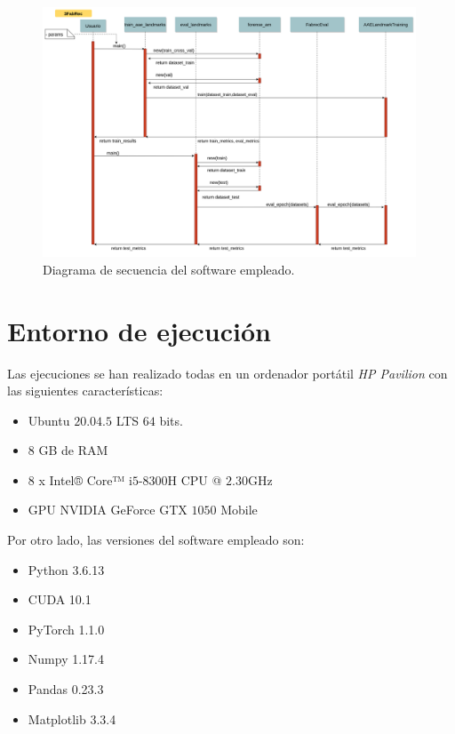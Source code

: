 \newpage

\begin{figure}[!h]
    \centering
    \includegraphics[width=0.99\textwidth]{img/Diagrama_secuencia.png}
    \caption{Diagrama de secuencia del software empleado.}
    \label{fig:Diagrama_secuencia}
\end{figure}

\newpage


\section{Entorno de ejecución}
\noindent Las ejecuciones se han realizado todas en un ordenador portátil \textit{HP Pavilion} con las siguientes características: 

\begin{itemize}
    \item Ubuntu $20.04.5$ LTS $64$ bits.
    \item $8$ GB de RAM
    \item $8$ x Intel® Core™ i$5$-$8300$H CPU @ $2.30$GHz
    \item GPU NVIDIA GeForce GTX $1050$ Mobile
\end{itemize}

\medskip

\noindent Por otro lado, las versiones del software empleado son: 

\begin{itemize}
    \item Python 3.6.13
    \item CUDA 10.1
    \item PyTorch 1.1.0
    \item Numpy 1.17.4
    \item Pandas 0.23.3
    \item Matplotlib 3.3.4
\end{itemize}


\endinput

